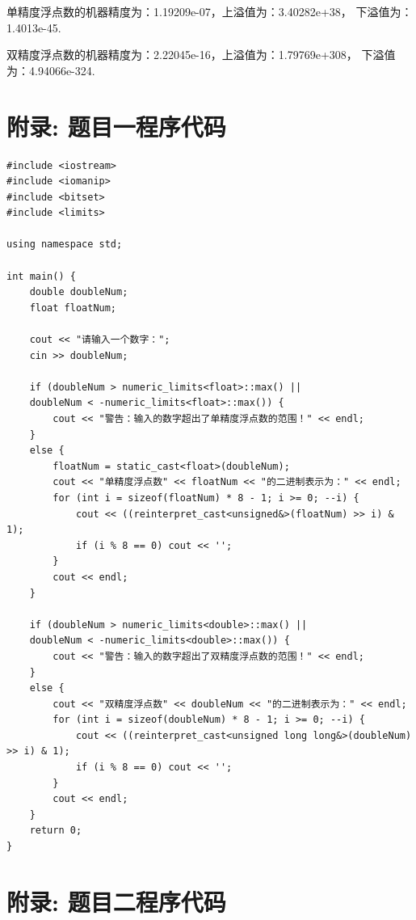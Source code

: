 \documentclass[UTF8,ctexart,a4paper,11pt,openany]{article}
\theoremstyle{definition}
\begin{document}
单精度浮点数的机器精度为：1.19209e-07，上溢值为：3.40282e+38， 下溢值为：1.4013e-45. \par

双精度浮点数的机器精度为：2.22045e-16，上溢值为：1.79769e+308， 下溢值为：4.94066e-324. \par
\clearpage

\section{附录: 题目一程序代码}

\begin{lstlisting}[aboveskip=0pt]
#include <iostream>
#include <iomanip>
#include <bitset>
#include <limits>

using namespace std;

int main() {
    double doubleNum;
    float floatNum;

    cout << "请输入一个数字：";
    cin >> doubleNum;

    if (doubleNum > numeric_limits<float>::max() || 
    doubleNum < -numeric_limits<float>::max()) {
        cout << "警告：输入的数字超出了单精度浮点数的范围！" << endl;
    }
    else {
        floatNum = static_cast<float>(doubleNum);
        cout << "单精度浮点数" << floatNum << "的二进制表示为：" << endl;
        for (int i = sizeof(floatNum) * 8 - 1; i >= 0; --i) {
            cout << ((reinterpret_cast<unsigned&>(floatNum) >> i) & 1);
            if (i % 8 == 0) cout << '';
        }
        cout << endl;
    }

    if (doubleNum > numeric_limits<double>::max() || 
    doubleNum < -numeric_limits<double>::max()) {
        cout << "警告：输入的数字超出了双精度浮点数的范围！" << endl;
    }
    else {
        cout << "双精度浮点数" << doubleNum << "的二进制表示为：" << endl;
        for (int i = sizeof(doubleNum) * 8 - 1; i >= 0; --i) {
            cout << ((reinterpret_cast<unsigned long long&>(doubleNum) >> i) & 1);
            if (i % 8 == 0) cout << '';
        }
        cout << endl;
    }
    return 0;
}    
\end{lstlisting}

\clearpage

\section{附录: 题目二程序代码}
\end{document}

